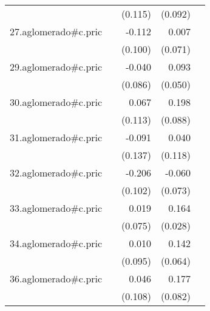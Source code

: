 {\begin{longtable}{l*{4}{D{.}{.}{-1}}}
            &                     &     (0.115)         &     (0.092)         &                     \\
\addlinespace
27.aglomerado#c.pric&                     &      -0.112         &       0.007         &                     \\
            &                     &     (0.100)         &     (0.071)         &                     \\
\addlinespace
29.aglomerado#c.pric&                     &      -0.040         &       0.093         &                     \\
            &                     &     (0.086)         &     (0.050)         &                     \\
\addlinespace
30.aglomerado#c.pric&                     &       0.067         &       0.198\sym{*}  &                     \\
            &                     &     (0.113)         &     (0.088)         &                     \\
\addlinespace
31.aglomerado#c.pric&                     &      -0.091         &       0.040         &                     \\
            &                     &     (0.137)         &     (0.118)         &                     \\
\addlinespace
32.aglomerado#c.pric&                     &      -0.206\sym{*}  &      -0.060         &                     \\
            &                     &     (0.102)         &     (0.073)         &                     \\
\addlinespace
33.aglomerado#c.pric&                     &       0.019         &       0.164\sym{***}&                     \\
            &                     &     (0.075)         &     (0.028)         &                     \\
\addlinespace
34.aglomerado#c.pric&                     &       0.010         &       0.142\sym{*}  &                     \\
            &                     &     (0.095)         &     (0.064)         &                     \\
\addlinespace
36.aglomerado#c.pric&                     &       0.046         &       0.177\sym{*}  &                     \\
            &                     &     (0.108)         &     (0.082)         &                     \\

\end{longtable}}
